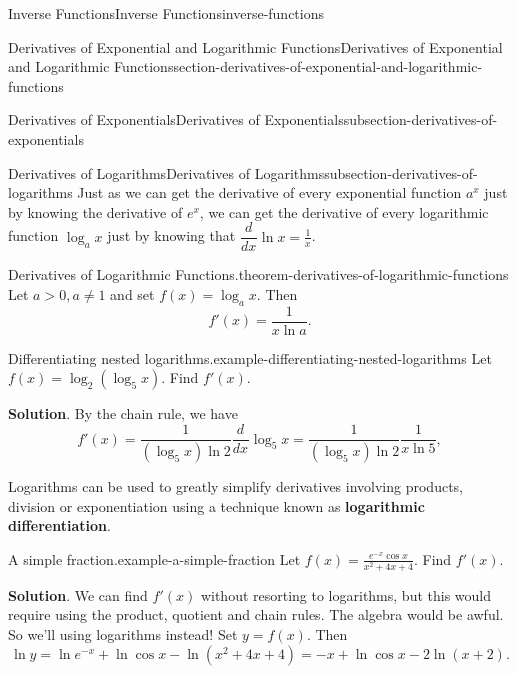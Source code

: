 \documentclass[oneside,10pt,]{book}
\newcommand{\terminology}[1]{\textbf{#1}}
\numberwithin{equation}{section}
\newcommand{\dv}[3][]{\dfrac{d^{#1} #2}{d #3^{#1}}}
\begin{document}
\begin{chapterptx}{Inverse Functions}{}{Inverse Functions}{}{}{inverse-functions}
\begin{sectionptx}{Derivatives of Exponential and Logarithmic Functions}{}{Derivatives of Exponential and Logarithmic Functions}{}{}{section-derivatives-of-exponential-and-logarithmic-functions}
\begin{subsectionptx}{Derivatives of Exponentials}{}{Derivatives of Exponentials}{}{}{subsection-derivatives-of-exponentials}
\end{subsectionptx}
%
%
\typeout{************************************************}
\typeout{************************************************}
%
\begin{subsectionptx}{Derivatives of Logarithms}{}{Derivatives of Logarithms}{}{}{subsection-derivatives-of-logarithms}
\hypertarget{p-235}{}%
Just as we can get the derivative of every exponential function \(a^{x}\) just by knowing the derivative of \(e^{x}\), we can get the derivative of every logarithmic function \(\log_{a}x\) just by knowing that \(\dv{}{x}\ln x = \frac{1}{x}\).%
\begin{theorem}{Derivatives of Logarithmic Functions.}{}{theorem-derivatives-of-logarithmic-functions}%
\hypertarget{p-236}{}%
Let \(a > 0, a\neq 1\) and set \(f(x) = \log_{a}x\). Then%
\begin{equation*}
f'(x) = \frac{1}{x\ln a}.
\end{equation*}
%
\end{theorem}
\begin{example}{Differentiating nested logarithms.}{example-differentiating-nested-logarithms}%
\hypertarget{p-237}{}%
Let \(f(x) = \log_{2}(\log_{5} x)\). Find \(f'(x)\).%
\par\smallskip%
\noindent\textbf{Solution}.\hypertarget{solution-51}{}\quad%
\hypertarget{p-238}{}%
By the chain rule, we have%
\begin{equation*}
f'(x) = \frac{1}{(\log_{5}x)\ln 2}\dv{}{x}\log_{5}x = \frac{1}{(\log_{5} x)\ln 2}\frac{1}{x\ln 5},
\end{equation*}
%
\end{example}
\hypertarget{p-239}{}%
Logarithms can be used to greatly simplify derivatives involving products, division or exponentiation using a technique known as \terminology{logarithmic differentiation}.%
\begin{example}{A simple fraction.}{example-a-simple-fraction}%
\hypertarget{p-240}{}%
Let \(f(x) = \frac{e^{-x}\cos x}{x^{2} + 4x + 4}\). Find \(f'(x)\).%
\par\smallskip%
\noindent\textbf{Solution}.\hypertarget{solution-52}{}\quad%
\hypertarget{p-241}{}%
We can find \(f'(x)\) without resorting to logarithms, but this would require using the product, quotient and chain rules. The algebra would be awful. So we'll using logarithms instead! Set \(y = f(x)\). Then%
\begin{equation*}
\ln y = \ln e^{-x} + \ln\cos x - \ln (x^{2} + 4x + 4) = -x + \ln\cos x - 2\ln(x+2).

\end{equation*}
\end{example}
\end{subsectionptx}
\end{sectionptx}
\end{chapterptx}
\end{document}
